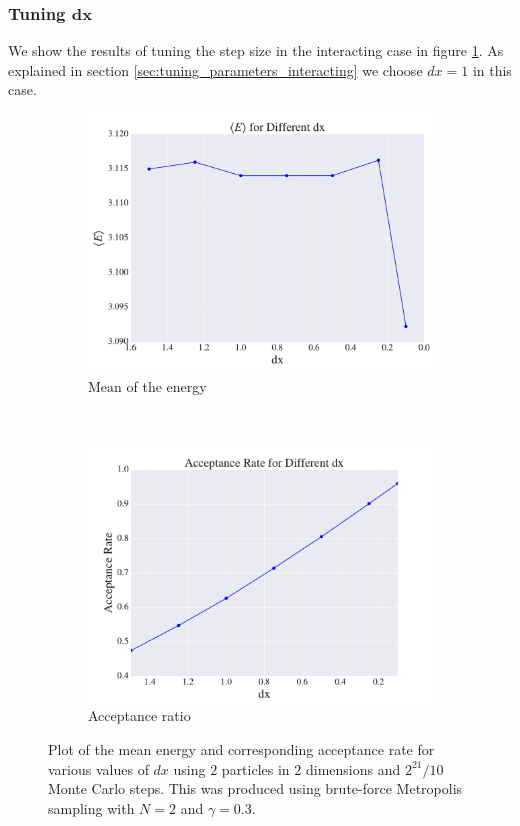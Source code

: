 \documentclass[a4paper, 10pt]{article}
\begin{document}
\subsubsection{Tuning $\boldsymbol{dx}$}
 We show the results of tuning the step size in the interacting case in figure \ref{fig:results_benchmark_no_importance_interacting}. As explained in section \ref{sec:tuning_parameters_interacting} we choose $dx=1$ in this case.\\
	 \begin{figure}[ht!]
	 	\centering
	 	\begin{subfigure}[b]{0.8\textwidth}
	 		\centering
	 		\includegraphics[width=\textwidth]{../Results/E_v_dx_normal_interacting.pdf}
	 		\caption{Mean of the energy}
	 	\end{subfigure}
	 	~
	 	\begin{subfigure}[b]{0.8\textwidth}
	 		\centering
	 		\includegraphics[width=\textwidth]{../Results/AC_normal_interacting.pdf}
	 		\caption{Acceptance ratio}
	 	\end{subfigure}
	 	\caption{Plot of the mean energy and corresponding acceptance rate for various values of $dx$ using $2$ particles in $2$ dimensions and $2^{21}/10$ Monte Carlo steps. This was produced using brute-force Metropolis sampling with $N=2$ and $\gamma=0.3$.}\label{fig:results_benchmark_no_importance_interacting}
	 \end{figure}\\
\end{document}
